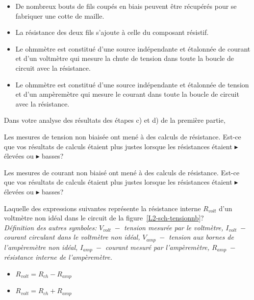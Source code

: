 \documentclass[canadien,12pt,oneside,letterpaper]{article}
\begin{document}
\begin{gradescope}
\begin{gradescope}
\begin{itemize}[label=$\blacktriangleright$]
    \item De nombreux bouts de fils coupés en biais peuvent être récupérés pour se fabriquer une cotte de maille.
    \item La résistance des deux fils s'ajoute à celle du composant résistif.
    \item Le ohmmètre est constitué d'une source indépendante et étalonnée de courant et d'un voltmètre qui mesure la chute de tension dans toute la boucle de circuit avec la résistance.
    \item Le ohmmètre est constitué d'une source indépendante et étalonnée de tension et d'un ampèremètre qui mesure le courant dans toute la boucle de circuit avec la résistance.  
    \end{itemize}
    \end{gradescope}
\item Dans votre analyse des résultats des étapes c) et d) de la première partie, 
    \begin{gradescope}
    \item Les mesures de tension non biaisée ont mené à des calculs de résistance. Est-ce que vos résultats de calculs étaient plus justes lorsque les résistances étaient $\blacktriangleright$ élevées ou $\blacktriangleright$ basses? 
    \item Les mesures de courant non biaisé ont mené à des calculs de résistance. Est-ce que vos résultats de calculs étaient plus justes lorsque les résistances étaient $\blacktriangleright$ élevées ou $\blacktriangleright$ basses? 
    \item Laquelle des expressions suivantes représente la résistance interne $R_{volt}$ d'un voltmètre non idéal dans le circuit de la figure~\ref{L2-sch-tensionnb}?\\ \textit{\footnotesize Définition des autres symboles: $V_{volt}\;-$ tension mesurée par le voltmètre, $I_{volt}\;- $ courant circulant dans le voltmètre non idéal, $V_{amp}\;-$ tension aux bornes de l'ampèremètre non idéal, $I_{amp}\;- $ courant mesuré par l'ampèremètre, $R_{amp}\;- $ résistance interne de l'ampèremètre.} 
    \begin{itemize}[label=$\blacktriangleright$]
    \item $R_{volt}=R_{ch}-R_{amp}$
    \item $R_{volt}=R_{ch}+R_{amp}$

\end{itemize}
\end{gradescope}
\end{gradescope}
\end{document}
